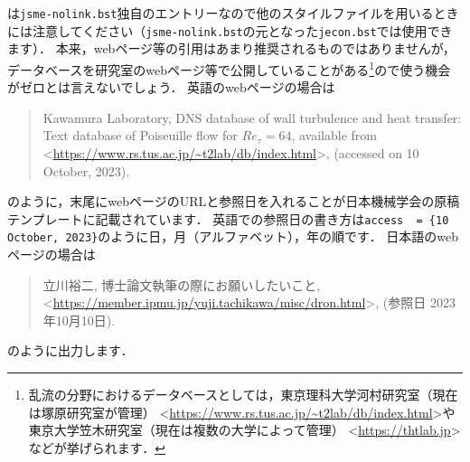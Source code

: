 \documentclass[a4paper,fleqn,uplatex,dvipdfmx]{jsarticle}
\newcommand{\jsmefile}{\texttt{jsme-nolink.bst}}
\begin{document}
\ttonline は\jsmefile 独自のエントリーなので他の\BibTeX{}スタイルファイルを用いるときには注意してください（\jsmefile の元となった\verb|jecon.bst|では使用できます）．
本来，webページ等の引用はあまり推奨されるものではありませんが，データベースを研究室のwebページ等で公開していることがある\footnote{乱流の分野におけるデータベースとしては，東京理科大学河村研究室（現在は塚原研究室が管理） \textless\url{https://www.rs.tus.ac.jp/~t2lab/db/index.html}\textgreater や東京大学笠木研究室（現在は複数の大学によって管理） \textless\url{https://thtlab.jp}\textgreater などが挙げられます．}ので使う機会がゼロとは言えないでしょう．
英語のwebページの場合は
\renewcommand\UrlFont{\rmfamily}
\begin{quote}
    Kawamura Laboratory, DNS database of wall turbulence and heat transfer: Text database of Poiseuille flow for $\mathit{Re}_\tau = 64$, available from \textless\url{https://www.rs.tus.ac.jp/~t2lab/db/index.html}\textgreater, (accessed on 10 October, 2023).
\end{quote}
\renewcommand\UrlFont{\ttfamily}
のように，末尾にwebページのURLと参照日を入れることが日本機械学会の原稿テンプレートに記載されています．
英語での参照日の書き方は\verb|access  = {10 October, 2023}|のように日，月（アルファベット），年の順です．
日本語のwebページの場合は
\renewcommand\UrlFont{\rmfamily}
\begin{quote}
    立川裕二, 博士論文執筆の際にお願いしたいこと, \textless\url{https://member.ipmu.jp/yuji.tachikawa/misc/dron.html}\textgreater, (参照日 2023年10月10日).
\end{quote}
\renewcommand\UrlFont{\ttfamily}
のように出力します．
\end{document}
